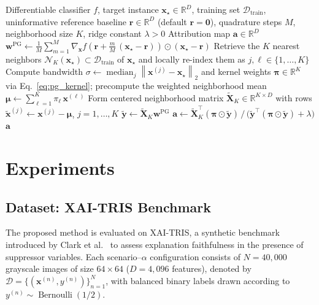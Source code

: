 \documentclass[pdflatex,sn-mathphys-num]{sn-jnl}
\theoremstyle{thmstyleone}
\theoremstyle{thmstyletwo}%
\theoremstyle{thmstylethree}%
\begin{document}
\begin{algorithm}[t]
\caption{PatternGrad Attribution}\label{algo:patterngrad}
\begin{algorithmic}[1]
\Require Differentiable classifier $f$, target instance $\mathbf{x}_\star \in \mathbb{R}^D$, training set $\mathcal{D}_{\text{train}}$, uninformative reference baseline $\mathbf{r} \in \mathbb{R}^D$ (default $\mathbf{r} = \mathbf{0}$), quadrature steps $M$, neighborhood size $K$, ridge constant $\lambda > 0$
\Ensure Attribution map $\mathbf{a} \in \mathbb{R}^D$
\State $\mathbf{w}^{\text{PG}} \leftarrow \frac{1}{M} \sum_{m=1}^{M} \nabla_{\mathbf{x}} f\!\left(\mathbf{r} + \frac{m}{M}\, (\mathbf{x}_\star - \mathbf{r})\right) \odot (\mathbf{x}_\star - \mathbf{r})$ 
\State Retrieve the $K$ nearest neighbors $\mathcal{N}_K(\mathbf{x}_\star) \subset \mathcal{D}_{\text{train}}$ of $\mathbf{x}_\star$ and locally re-index them as $j, \ell \in \{1, \dots, K\}$ 
\State Compute bandwidth $\sigma \leftarrow \operatorname{median}_{j} \left\|\mathbf{x}^{(j)} - \mathbf{x}_\star\right\|_2$ and kernel weights $\boldsymbol{\pi} \in \mathbb{R}^K$ via Eq.~\eqref{eq:pg_kernel}; precompute the weighted neighborhood mean $\boldsymbol{\mu} \leftarrow \sum_{\ell=1}^{K} \pi_\ell\, \mathbf{x}^{(\ell)}$
\State Form centered neighborhood matrix $\tilde{\mathbf{X}}_K \in \mathbb{R}^{K \times D}$ with rows $\tilde{\mathbf{x}}^{(j)} \leftarrow \mathbf{x}^{(j)} - \boldsymbol{\mu}$, $j = 1, \dots, K$
\State $\tilde{\mathbf{y}} \leftarrow \tilde{\mathbf{X}}_K \mathbf{w}^{\text{PG}}$ 
\State $\mathbf{a} \leftarrow \tilde{\mathbf{X}}_K^\top (\boldsymbol{\pi} \odot \tilde{\mathbf{y}}) \,\big/\, \big(\tilde{\mathbf{y}}^\top (\boldsymbol{\pi} \odot \tilde{\mathbf{y}}) + \lambda\big)$ 
\State \Return $\mathbf{a}$
\end{algorithmic}
\end{algorithm}


\section{Experiments}

\subsection{Dataset: XAI-TRIS Benchmark}\label{sec:dataset}
The proposed method is evaluated on XAI-TRIS, a synthetic benchmark introduced by Clark et al.~\cite{clark2024} to assess explanation faithfulness in the presence of suppressor variables. Each scenario--$\alpha$ configuration consists of $N = 40{,}000$ grayscale images of size $64 \times 64$ ($D = 4{,}096$ features), denoted by $\mathcal{D} = \{(\mathbf{x}^{(n)}, y^{(n)})\}_{n=1}^{N}$, with balanced binary labels drawn according to $y^{(n)} \sim \operatorname{Bernoulli}(1/2)$.
\end{document}
